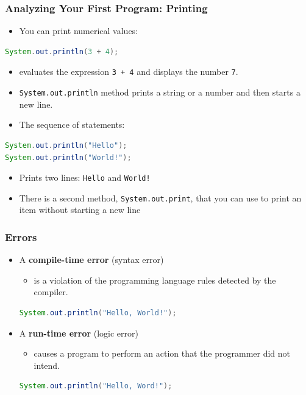 \documentclass{beamer}
\begin{document}
\begin{frame}[t,fragile] \frametitle{Analyzing Your First Program: Printing} %
    \begin{itemize}
        \item You can print numerical values:
    \end{itemize}
\begin{lstlisting}[language=Java]
System.out.println(3 + 4);
\end{lstlisting}
    \begin{itemize}
        \item evaluates the expression \texttt{3 + 4} and displays the number \texttt{7}.
        \item \texttt{System.out.println} method prints a string or a number and then starts a new line.
        \item The sequence of statements:
    \end{itemize}
\begin{lstlisting}[language=Java]
System.out.println("Hello");
System.out.println("World!");
\end{lstlisting}
    \begin{itemize}
        \item Prints two lines: \texttt{Hello} and \texttt{World!}
        \item There is a second method, \texttt{System.out.print}, that you can use to print an item without starting a new line
    \end{itemize}
\end{frame}

\begin{frame}[t,fragile] \frametitle{Errors} %
    \begin{itemize}
        \item A \textbf{compile-time error} (syntax error)
        \begin{itemize}
            \item is a violation of the programming language rules detected by the compiler.
        \end{itemize}
\begin{lstlisting}[language=Java]
System.out.println("Hello, World!");
\end{lstlisting}
        \item A \textbf{run-time error} (logic error)
        \begin{itemize}
            \item causes a program to perform an action that the programmer did not intend.
        \end{itemize}
\begin{lstlisting}[language=Java]
System.out.println("Hello, Word!");
\end{lstlisting}
    \end{itemize}
\end{frame}
\end{document}
